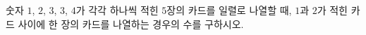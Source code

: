 숫자 $1$, $2$, $3$, $3$, $4$가 각각 하나씩 적힌 $5$장의 카드를 일렬로 나열할 때, $1$과 $2$가 적힌 카드 사이에 한 장의 카드를 나열하는 경우의 수를 구하시오. 

